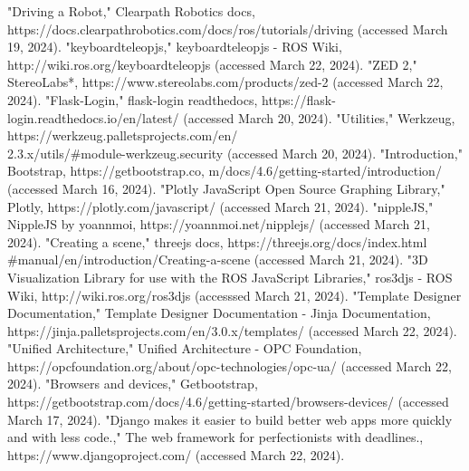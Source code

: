 \documentclass[conference]{IEEEtran}
\begin{document}
\begin{thebibliography}{00}
"Driving a Robot," Clearpath Robotics docs, https://docs.clearpathrobotics.com/docs/ros/tutorials/driving (accessed March 19, 2024).
"keyboardteleopjs," keyboardteleopjs - ROS Wiki, http://wiki.ros.org/keyboardteleopjs (accessed March 22, 2024).
"ZED 2," StereoLabs*, https://www.stereolabs.com/products/zed-2 (accessed March 22, 2024).
"Flask-Login," flask-login readthedocs, https://flask-login.readthedocs.io/en/latest/ (accessed March 20, 2024).
"Utilities," Werkzeug, https://werkzeug.palletsprojects.com/en/\\2.3.x/utils/\#module-werkzeug.security (accessed March 20, 2024).
"Introduction," Bootstrap, https://getbootstrap.co, m/docs/4.6/getting-started/introduction/ (accessed March 16, 2024).
"Plotly JavaScript Open Source Graphing Library," Plotly, https://plotly.com/javascript/ (accessed March 21, 2024).
"nippleJS," NippleJS by yoannmoi, https://yoannmoi.net/nipplejs/ (accessed March 21, 2024).
"Creating a scene," threejs docs, https://threejs.org/docs/index.html\\\#manual/en/introduction/Creating-a-scene (accessed March 21, 2024).
"3D Visualization Library for use with the ROS JavaScript Libraries," ros3djs - ROS Wiki, http://wiki.ros.org/ros3djs (accesssed March 21, 2024).
"Template Designer Documentation," Template Designer Documentation - Jinja Documentation, https://jinja.palletsprojects.com/en/3.0.x/templates/ (accessed March 22, 2024).
"Unified Architecture," Unified Architecture - OPC Foundation, https://opcfoundation.org/about/opc-technologies/opc-ua/ (accessed March 22, 2024).
"Browsers and devices," Getbootstrap, https://getbootstrap.com/docs/4.6/getting-started/browsers-devices/ (accessed March 17, 2024).
"Django makes it easier to build better web apps more quickly and with less code.," The web framework for perfectionists with deadlines., https://www.djangoproject.com/ (accessed March 22, 2024).
\end{thebibliography}
\vspace{12pt}
\end{document}
